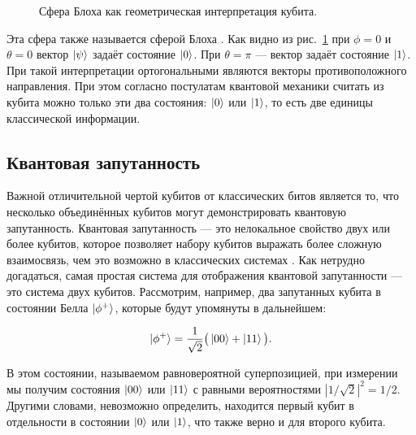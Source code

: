 \documentclass[a4paper,11pt]{article}
\begin{document}
\begin{figure}[h]
	\caption{Сфера Блоха как геометрическая интерпретация кубита.}
	\label{ris:image3}
\end{figure}

Эта сфера также называется сферой Блоха \cite{sphere}. Как видно из рис.~\ref{ris:image3} при $\phi = 0$ и $\theta = 0$ вектор $\ket{\psi}$
задаёт состояние $\ket{0}$. При $\theta = \pi$ --- вектор задаёт состояние $\ket{1}$. При такой интерпретации ортогональными являются векторы противоположного направления.
При этом согласно постулатам квантовой механики считать из кубита можно только эти два состояния: $\ket{0}$ или $\ket{1}$, то есть две единицы классической информации.




\subsection{Квантовая запутанность \cite{quant,entangle}}
Важной отличительной чертой кубитов от классических битов является то, что несколько объединённых кубитов могут демонстрировать квантовую запутанность. Квантовая запутанность --- это нелокальное свойство двух или более кубитов, которое позволяет набору кубитов выражать более сложную взаимосвязь, чем это возможно в классических системах \cite{entangle}. Как нетрудно догадаться, самая простая система для отображения квантовой запутанности --- это система двух кубитов. Рассмотрим, например, два запутанных кубита в состоянии Белла $\ket{\phi^+}$, которые будут упомянуты в дальнейшем:

\begin{equation*}
\ket{\phi^+} = \dfrac{1}{\sqrt2} \big(\ket{00} + \ket{11} \big).
\end{equation*}


В этом состоянии, называемом равновероятной суперпозицией, при измерении мы получим состояния $\ket{00}$ или $\ket{11}$ с равными вероятностями $|1 / \sqrt2|^2 = 1/2$. Другими словами, невозможно определить, находится первый кубит в отдельности в состоянии $\ket{0}$ или $\ket{1}$, что также верно и для второго кубита.
\end{document}
